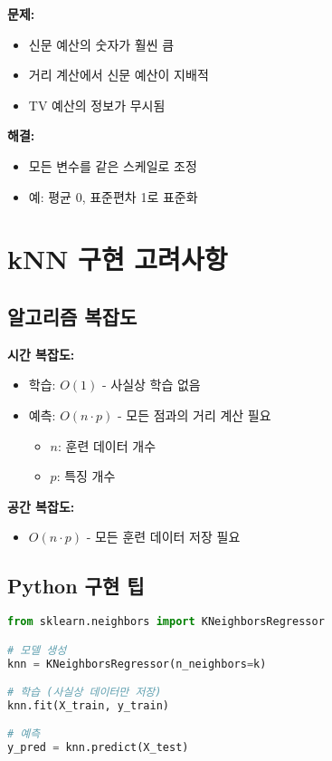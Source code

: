 \documentclass[12pt,a4paper]{article}
\begin{document}
\textbf{문제:}
\begin{itemize}
    \item 신문 예산의 숫자가 훨씬 큼
    \item 거리 계산에서 신문 예산이 지배적
    \item TV 예산의 정보가 무시됨
\end{itemize}

\textbf{해결:}
\begin{itemize}
    \item 모든 변수를 같은 스케일로 조정
    \item 예: 평균 0, 표준편차 1로 표준화
\end{itemize}

\section{kNN 구현 고려사항}

\subsection{알고리즘 복잡도}

\textbf{시간 복잡도:}
\begin{itemize}
    \item 학습: $O(1)$ - 사실상 학습 없음
    \item 예측: $O(n \cdot p)$ - 모든 점과의 거리 계산 필요
    \begin{itemize}
        \item $n$: 훈련 데이터 개수
        \item $p$: 특징 개수
    \end{itemize}
\end{itemize}

\textbf{공간 복잡도:}
\begin{itemize}
    \item $O(n \cdot p)$ - 모든 훈련 데이터 저장 필요
\end{itemize}

\subsection{Python 구현 팁}

\begin{lstlisting}[language=Python]
from sklearn.neighbors import KNeighborsRegressor

# 모델 생성
knn = KNeighborsRegressor(n_neighbors=k)

# 학습 (사실상 데이터만 저장)
knn.fit(X_train, y_train)

# 예측
y_pred = knn.predict(X_test)
\end{lstlisting}
\end{document}
